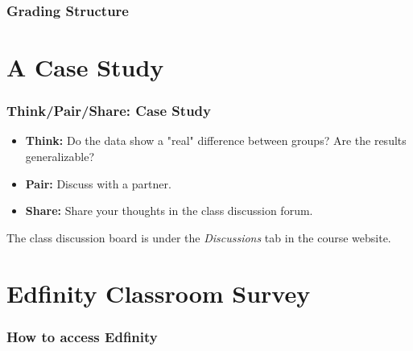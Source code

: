 \documentclass[slidestop,compress,mathserif]{beamer}
\begin{document}

\begin{frame}
	\frametitle{Grading Structure} %
\end{frame}


\section{A Case Study}


\begin{frame}
	\frametitle{Think/Pair/Share: Case Study}
	\begin{itemize}
		\item \textbf{Think:} Do the data show a "real" difference between groups? Are the results generalizable?
		\item \textbf{Pair:} Discuss with a partner.
		\item \textbf{Share:} Share your thoughts in the class discussion forum.
	\end{itemize}

	The class discussion board is under the \textit{Discussions} tab in the course website. %
\end{frame}




\section{Edfinity Classroom Survey}

\begin{frame}
	\frametitle{How to access Edfinity} %
\end{frame}




\end{document}
